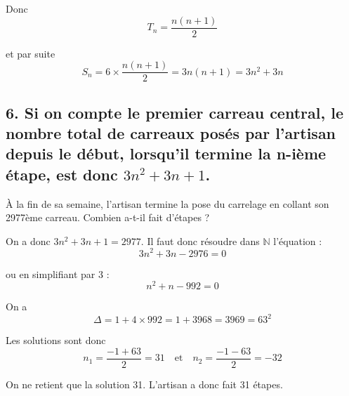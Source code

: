 	Donc
	\[
	T_n = \dfrac{n(n+1)}{2}
	\]
	
	et par suite
	\[
	S_n = 6 \times \dfrac{n(n+1)}{2} = 3n(n+1) = 3n^2 + 3n
	\]
	
	\subsection*{6. Si on compte le premier carreau central, le nombre total de carreaux posés par l’artisan depuis le début, lorsqu’il termine la n-ième étape, est donc $3n^2 + 3n + 1$.}
	
	À la fin de sa semaine, l’artisan termine la pose du carrelage en collant son 2977ème carreau. Combien a-t-il fait d’étapes ?
	
	On a donc $3n^2 + 3n + 1 = 2977$. Il faut donc résoudre dans $\mathbb{N}$ l’équation :
	\[
	3n^2 + 3n - 2976 = 0
	\]
	
	ou en simplifiant par 3 :
	\[
	n^2 + n - 992 = 0
	\]
	
	On a
	\[
	\Delta = 1 + 4 \times 992 = 1 + 3968 = 3969 = 63^2
	\]
	
	Les solutions sont donc
	\[
	n_1 = \dfrac{-1 + 63}{2} = 31 \quad \text{et} \quad n_2 = \dfrac{-1 - 63}{2} = -32
	\]
	
	On ne retient que la solution 31. L’artisan a donc fait 31 étapes.
